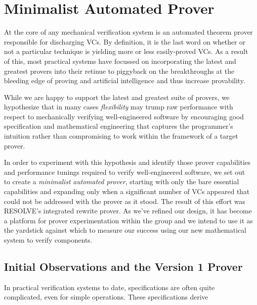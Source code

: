 


\chapter{Minimalist Automated Prover\label{ch:prover}}
At the core of any mechanical verification system is an automated theorem prover responsible for discharging VCs.  By definition, it is the last word on whether or not a particular technique is yielding more or less easily-proved VCs.  As a result of this, most practical systems have focussed on incorporating the latest and greatest provers into their retinue to piggyback on the breakthroughs at the bleeding edge of proving and artificial intelligence and thus increase provability.

While we are happy to support the latest and greatest suite of provers, we hypothesize that in many cases \emph{flexibility} may trump raw performance with respect to mechanically verifying well-engineered software by encouraging good specification and mathematical engineering that captures the programmer's intuition rather than compromising to work within the framework of a target prover.

In order to experiment with this hypothesis and identify those prover capabilities and performance tunings required to verify well-engineered software, we set out to create a \emph{minimalist automated prover}, starting with only the bare essential capabilities and expanding only when a significant number of VCs appeared that could not be addressed with the prover as it stood.  The result of this effort was RESOLVE's integrated rewrite prover.  As we've refined our design, it has become a platform for prover experimentation within the group and we intend to use it as the yardstick against which to measure our success using our new mathematical system to verify components.


\section{Initial Observations and the Version 1 Prover}

In practical verification systems to date, specifications are often quite complicated, even for simple operations.  These specifications derive 


